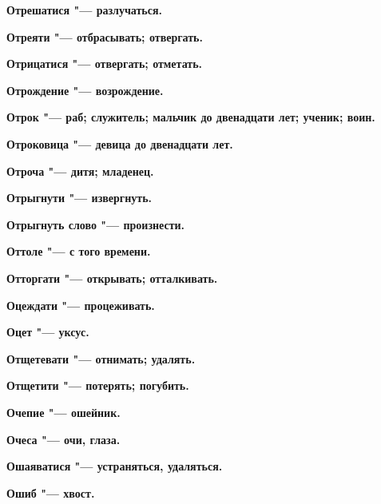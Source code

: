 \bfseries Отрешатися \normalfont{} "--- разлучаться. 




\bfseries Отреяти \normalfont{} "--- отбрасывать; отвергать. 




\bfseries Отрицатися \normalfont{} "--- отвергать; отметать. 




\bfseries Отрождение \normalfont{} "--- возрождение. 




\bfseries Отрок \normalfont{} "--- раб; служитель; мальчик до двенадцати лет; ученик; воин. 




\bfseries Отроковица \normalfont{} "--- девица до двенадцати лет. 




\bfseries Отроча \normalfont{} "--- дитя; младенец. 




\bfseries Отрыгнути \normalfont{} "--- извергнуть. 




\bfseries Отрыгнуть слово \normalfont{} "--- произнести. 




\bfseries Оттоле \normalfont{} "--- с того времени. 




\bfseries Отторгати \normalfont{} "--- открывать; отталкивать. 




\bfseries Оцеждати \normalfont{} "--- процеживать. 




\bfseries Оцет \normalfont{} "--- уксус. 




\bfseries Отщетевати \normalfont{} "--- отнимать; удалять. 




\bfseries Отщетити \normalfont{} "--- потерять; погубить. 




\bfseries Очепие \normalfont{} "--- ошейник. 




\bfseries Очеса \normalfont{} "--- очи, глаза. 




\bfseries Ошаяватися \normalfont{} "--- устраняться, удаляться. 




\bfseries Ошиб \normalfont{} "--- хвост. 




